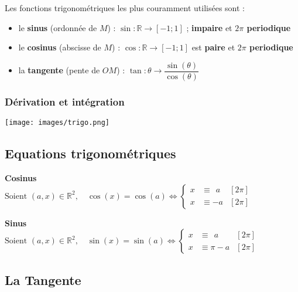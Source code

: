 \documentclass{report}
\newcommand{\R}{\mathbb{R}}
\begin{document}
        Les fonctions trigonométriques les plus couramment utilisées sont :

          \begin{itemize}
            \item le \textbf{sinus} (ordonnée de $M$) : $\sin : \R \to [-1 ; 1]$ ; \textbf{impaire} et \textbf{$2\pi$ periodique}
            \item le \textbf{cosinus} (abscisse de $M$) : $\cos : \R \to [-1 ; 1]$ est \textbf{paire} et \textbf{$2\pi$ periodique}
            \item la \textbf{tangente} (pente de $OM$) : $\tan : \theta \to \dfrac{\sin(\theta)}{\cos(\theta)}$
          \end{itemize}

        \subsubsection{Dérivation et intégration}
      
          \begin{center}
            \texttt{[image: images/trigo.png]}
          \end{center} 

      \subsection{Equations trigonométriques}

          \textbf{Cosinus~~~}
            \(\displaystyle\text{Soient } (a,x)\in \R^2 , \quad \cos(x) = \cos(a) \iff \left\{ \begin{aligned}
              x &\equiv ~~a&[2\pi]\\
              x &\equiv -a&[2\pi]              
            \end{aligned}\right.\)

          \textbf{Sinus~~~~~~~}
            \(\displaystyle\text{Soient } (a,x)\in \R^2 , \quad \sin(x) = \sin(a) \iff \left\{ \begin{aligned}
              x &\equiv ~~a&[2\pi]\\
              x &\equiv \pi-a&[2\pi]              
            \end{aligned}\right.\)




    \iffalse

      \subsection{La Tangente}
\end{document}
